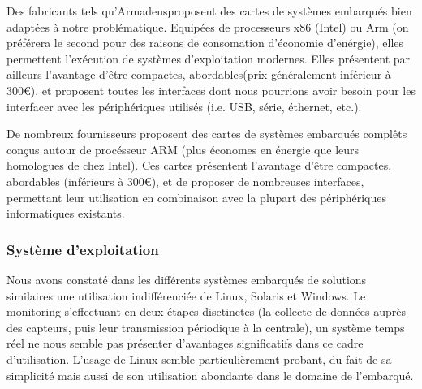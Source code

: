 Des fabricants tels qu'Armadeus\footnotemark proposent des cartes de systèmes embarqués bien adaptées à notre problématique. Equipées de processeurs x86 (Intel) ou Arm (on préférera le second pour des raisons de consomation d'économie d'enérgie), elles permettent l'exécution de systèmes d'exploitation modernes. Elles présentent par ailleurs l'avantage d'être compactes, abordables\footnotemark (prix généralement inférieur à 300\euro ), et proposent toutes les interfaces dont nous pourrions avoir besoin pour les interfacer avec les périphériques utilisés (i.e. USB, série, éthernet, etc.).

De nombreux fournisseurs proposent des cartes de systèmes embarqués complêts conçus autour de procésseur ARM (plus économes en énergie que leurs homologues de chez Intel). Ces cartes présentent l'avantage d'être compactes, abordables (inférieurs à 300\euro ), et de proposer de nombreuses interfaces, permettant leur utilisation en combinaison avec la plupart des périphériques informatiques existants.



\subsubsection{Système d'exploitation}

Nous avons constaté dans les différents systèmes embarqués de solutions similaires une utilisation indifférenciée de Linux, Solaris et Windows\footnotemark. Le monitoring s'effectuant en deux étapes disctinctes (la collecte de données auprès des capteurs, puis leur transmission périodique à la centrale), un système temps réel ne nous semble pas présenter d'avantages significatifs dans ce cadre d'utilisation. L'usage de Linux semble particulièrement probant, du fait de sa simplicité mais aussi de son utilisation abondante dans le domaine de l'embarqué.



